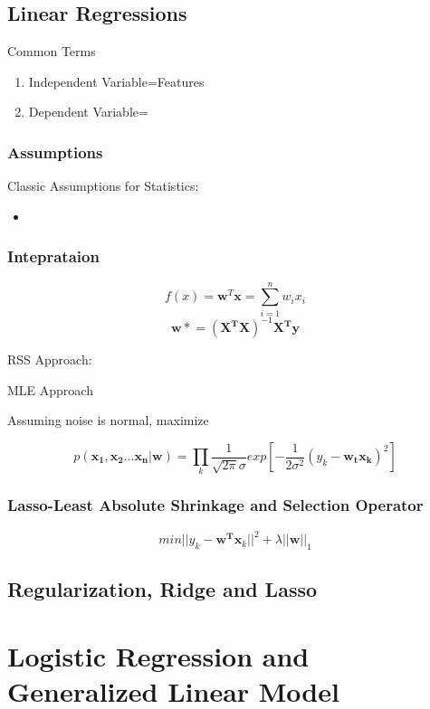 \documentclass[11pt, openany]{book}              %
\begin{document}
\section{Linear Regressions}

Common Terms

\begin{enumerate}
    \item Independent Variable=Features
    \item Dependent Variable=
\end{enumerate}


\subsection{Assumptions}
Classic Assumptions for Statistics:
\begin{itemize}
    \item 
\end{itemize}

\subsection{Inteprataion}

$$ f(x) = \mathbf{w}^T \mathbf{x} = \sum_{i=1}^n w_i x_i $$
$$ \mathbf{w*} = (\mathbf{X^T X})^{-1} \mathbf{X^T y} $$

RSS Approach:


MLE Approach

Assuming noise is normal, maximize 

$$p(\mathbf{x_1, x_2 ... x_n}| \mathbf{ w} ) = \prod_k \frac{1}{\sqrt{2\pi} \sigma} exp[ -\frac{1}{2\sigma^2} (y_k - \mathbf{w_t x_k} )^2 ]$$ 

\subsection{Lasso-Least Absolute Shrinkage and Selection Operator}

$$ min ||y_k - \mathbf{w^T x}_k ||^2 + \lambda ||\mathbf{w}||_1 $$

\section{Regularization, Ridge and Lasso}

\chapter{Logistic Regression and Generalized Linear Model}
\end{document}
